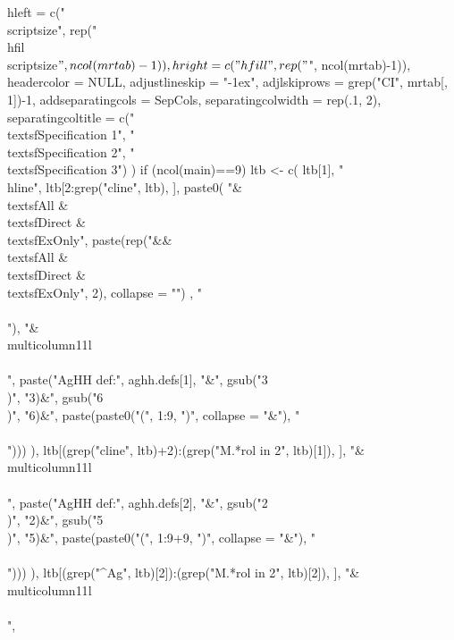 \begin{Schunk}
\begin{Sinput}
{      hleft = c("\\scriptsize", rep("\\hfil\\scriptsize$", ncol(mrtab)-1)), 
      hright = c("\\hfill", rep("$", ncol(mrtab)-1)),
      headercolor = NULL, 
      adjustlineskip = "-1ex", adjlskiprows = grep("CI", mrtab[, 1])-1,
      addseparatingcols = SepCols, separatingcolwidth = rep(.1, 2), 
      separatingcoltitle = c("\\textsf{Specification 1}", "\\textsf{Specification 2}", "\\textsf{Specification 3}")
    ) 
  if (ncol(main)==9) 
    ltb <- c(
      ltb[1], 
      "\\hline", 
      ltb[2:grep("cline", ltb), ],
      paste0(
        "&\\textsf{All} & \\textsf{Direct} & \\textsf{ExOnly}",
        paste(rep("&&\\textsf{All} & \\textsf{Direct} & \\textsf{ExOnly}", 2), collapse = "")
        , "\\\\"),
      "&\\multicolumn{11}{l}{}\\\\",
      paste("AgHH def:", aghh.defs[1], "&",
        gsub("3\\)", "3)&", gsub("6\\)", "6)&", paste(paste0("(", 1:9, ")", collapse = "&"), "\\\\")))
        ),
      ltb[(grep("cline", ltb)+2):(grep("M.*rol in 2", ltb)[1]), ], 
      "&\\multicolumn{11}{l}{}\\\\",
      paste("AgHH def:", aghh.defs[2], "&",
        gsub("2\\)", "2)&", gsub("5\\)", "5)&", paste(paste0("(", 1:9+9, ")", collapse = "&"), "\\\\")))
        ),
      ltb[(grep("^Ag", ltb)[2]):(grep("M.*rol in 2", ltb)[2]), ],
      "&\\multicolumn{11}{l}{}\\\\",
}
\end{Sinput}
\end{Schunk}
